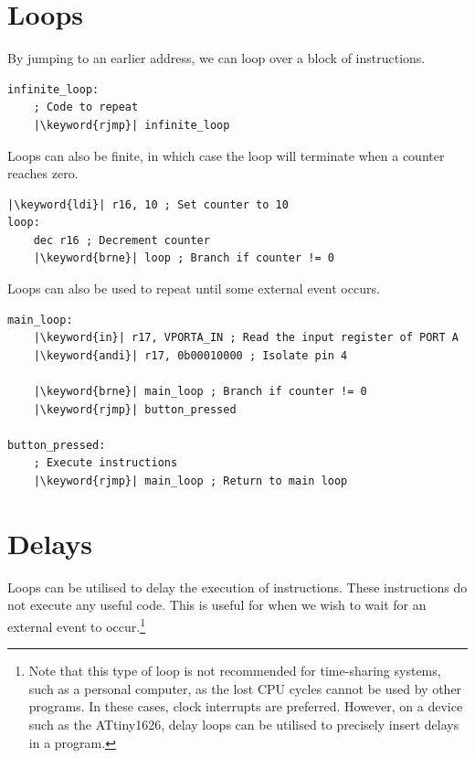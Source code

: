 \documentclass{report}
\newcommand{\keyword}[1]{\textcolor[rgb]{0.00,0.50,0.00}{\textbf{#1}}}
\begin{document}
\section{Loops}
By jumping to an earlier address, we can loop over a block of instructions.
\begin{verbatim}
infinite_loop:
    ; Code to repeat
    |\keyword{rjmp}| infinite_loop
\end{verbatim}
Loops can also be finite, in which case the loop will terminate when a counter reaches zero.
\begin{verbatim}
|\keyword{ldi}| r16, 10 ; Set counter to 10
loop:
    dec r16 ; Decrement counter
    |\keyword{brne}| loop ; Branch if counter != 0
\end{verbatim}
Loops can also be used to repeat until some external event occurs.
\begin{verbatim}
main_loop:
    |\keyword{in}| r17, VPORTA_IN ; Read the input register of PORT A
    |\keyword{andi}| r17, 0b00010000 ; Isolate pin 4

    |\keyword{brne}| main_loop ; Branch if counter != 0
    |\keyword{rjmp}| button_pressed

button_pressed:
    ; Execute instructions
    |\keyword{rjmp}| main_loop ; Return to main loop
\end{verbatim}
\section{Delays}
Loops can be utilised to delay the execution of instructions. These instructions do
not execute any useful code. This is useful for when we wish to wait for an external event to occur.\footnote{Note that this type of loop is not recommended for time-sharing systems, such as a personal computer, as the lost CPU cycles cannot be used by other programs. In these cases, clock interrupts are preferred. However, on a device such as the ATtiny1626, delay loops can be utilised to precisely insert delays in a program.}
\end{document}
